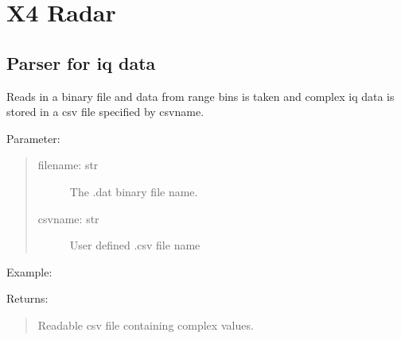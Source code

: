 \documentclass[letterpaper,10pt,english]{sphinxmanual}
\begin{document}
\section{X4 Radar}
\label{\detokenize{X4 radar:x4-radar}}\label{\detokenize{X4 radar::doc}}

\subsection{Parser for iq data}
\label{\detokenize{X4 radar:module-X4_parser}}\label{\detokenize{X4 radar:parser-for-iq-data}}

\begin{fulllineitems}
\label{\detokenize{X4 radar:X4_parser.iq_data}}
Reads in a binary file and data from range bins is taken and complex iq data is stored in a csv file specified by csvname.

Parameter:
\begin{quote}
\begin{description}
\item[{filename: str}] \leavevmode
The .dat binary file name.

\item[{csvname: str}] \leavevmode
User defined .csv file name

\end{description}
\end{quote}

Example:

\begin{sphinxVerbatim}[commandchars=\\\{\}]
\end{sphinxVerbatim}

Returns:
\begin{quote}

Readable csv file containing complex values.
\end{quote}

\end{fulllineitems}
\end{document}
